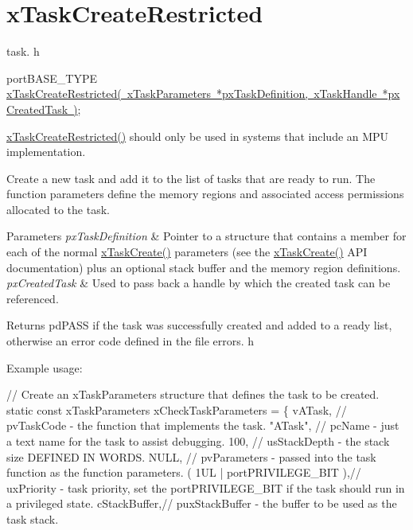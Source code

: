 \hypertarget{group__x_task_create_restricted}{}\section{x\+Task\+Create\+Restricted}
\label{group__x_task_create_restricted}
task. h 
\begin{DoxyPre}
 portBASE\_TYPE \mbox{\hyperlink{task_8h_a61b00cd623953f4f94fe794057d7f648}{xTaskCreateRestricted( xTaskParameters *pxTaskDefinition, xTaskHandle *pxCreatedTask )}};\end{DoxyPre}


\mbox{\hyperlink{task_8h_a61b00cd623953f4f94fe794057d7f648}{x\+Task\+Create\+Restricted()}} should only be used in systems that include an M\+PU implementation.

Create a new task and add it to the list of tasks that are ready to run. The function parameters define the memory regions and associated access permissions allocated to the task.


\begin{DoxyParams}{Parameters}
{\em px\+Task\+Definition} & Pointer to a structure that contains a member for each of the normal \mbox{\hyperlink{task_8h_adf67e7cd0bfd1eda9e8afd048206f7c2}{x\+Task\+Create()}} parameters (see the \mbox{\hyperlink{task_8h_adf67e7cd0bfd1eda9e8afd048206f7c2}{x\+Task\+Create()}} A\+PI documentation) plus an optional stack buffer and the memory region definitions.\\
\hline
{\em px\+Created\+Task} & Used to pass back a handle by which the created task can be referenced.\\
\hline
\end{DoxyParams}
\begin{DoxyReturn}{Returns}
pd\+P\+A\+SS if the task was successfully created and added to a ready list, otherwise an error code defined in the file errors. h
\end{DoxyReturn}
Example usage\+: 
\begin{DoxyPre}
// Create an xTaskParameters structure that defines the task to be created.
static const xTaskParameters xCheckTaskParameters =
\{
    vATask,     // pvTaskCode - the function that implements the task.
    "ATask",    // pcName - just a text name for the task to assist debugging.
    100,        // usStackDepth - the stack size DEFINED IN WORDS.
    NULL,       // pvParameters - passed into the task function as the function parameters.
    ( 1UL | portPRIVILEGE\_BIT ),// uxPriority - task priority, set the portPRIVILEGE\_BIT if the task should run in a privileged state.
    cStackBuffer,// puxStackBuffer - the buffer to be used as the task stack.\end{DoxyPre}



